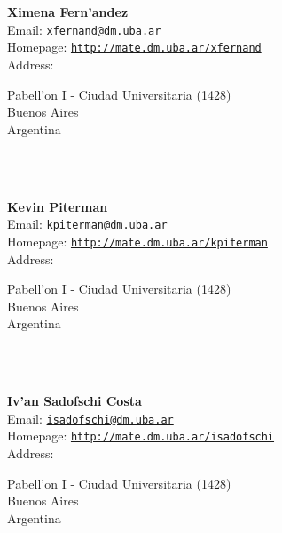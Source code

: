 \documentclass[a4paper,11pt]{report}
\begin{document}
\begin{titlepage}
\mbox{}\\
{\mbox{}\\
\small \noindent \textbf{ Ximena Fern{\a'a}ndez\\
    }  Email: \href{mailto://xfernand@dm.uba.ar} {\texttt{xfernand@dm.uba.ar}}\\
  Homepage: \href{http://mate.dm.uba.ar/~xfernand} {\texttt{http://mate.dm.uba.ar/\texttt{}xfernand}}\\
  Address: \begin{minipage}[t]{8cm}\noindent
 Pabell{\a'o}n I - Ciudad Universitaria (1428)\\
 Buenos Aires\\
 Argentina\\
 \end{minipage}
}\\
{\mbox{}\\
\small \noindent \textbf{ Kevin Piterman\\
    }  Email: \href{mailto://kpiterman@dm.uba.ar} {\texttt{kpiterman@dm.uba.ar}}\\
  Homepage: \href{http://mate.dm.uba.ar/~kpiterman} {\texttt{http://mate.dm.uba.ar/\texttt{}kpiterman}}\\
  Address: \begin{minipage}[t]{8cm}\noindent
 Pabell{\a'o}n I - Ciudad Universitaria (1428)\\
 Buenos Aires\\
 Argentina\\
 \end{minipage}
}\\
{\mbox{}\\
\small \noindent \textbf{ Iv{\a'a}n Sadofschi Costa\\
    }  Email: \href{mailto://isadofschi@dm.uba.ar} {\texttt{isadofschi@dm.uba.ar}}\\
  Homepage: \href{http://mate.dm.uba.ar/~isadofschi} {\texttt{http://mate.dm.uba.ar/\texttt{}isadofschi}}\\
  Address: \begin{minipage}[t]{8cm}\noindent
 Pabell{\a'o}n I - Ciudad Universitaria (1428)\\
 Buenos Aires\\
 Argentina\\
 \end{minipage}
}\\
\end{titlepage}

\newpage\setcounter{page}{2}
\newpage
\end{document}
